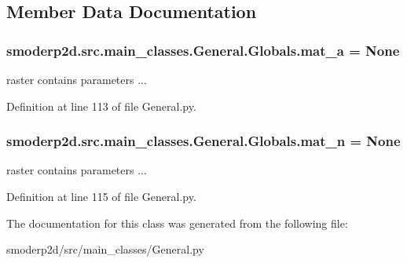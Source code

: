 \subsection{Member Data Documentation}
\hypertarget{classsmoderp2d_1_1src_1_1main__classes_1_1General_1_1Globals_a68216400ee957d32802e316cf9d21d75}{
\subsubsection[{mat\-\_\-a}]{\setlength{\rightskip}{0pt plus 5cm}smoderp2d.\-src.\-main\-\_\-classes.\-General.\-Globals.\-mat\-\_\-a = None\hspace{0.3cm}{\ttfamily [static]}}}\label{classsmoderp2d_1_1src_1_1main__classes_1_1General_1_1Globals_a68216400ee957d32802e316cf9d21d75}


raster contains parameters ... 



Definition at line 113 of file General.\-py.

\hypertarget{classsmoderp2d_1_1src_1_1main__classes_1_1General_1_1Globals_a5e657e5a7569cc4bcb1be595e5a16278}{
\subsubsection[{mat\-\_\-n}]{\setlength{\rightskip}{0pt plus 5cm}smoderp2d.\-src.\-main\-\_\-classes.\-General.\-Globals.\-mat\-\_\-n = None\hspace{0.3cm}{\ttfamily [static]}}}\label{classsmoderp2d_1_1src_1_1main__classes_1_1General_1_1Globals_a5e657e5a7569cc4bcb1be595e5a16278}


raster contains parameters ... 



Definition at line 115 of file General.\-py.



The documentation for this class was generated from the following file\-:\begin{DoxyCompactItemize}
\item 
smoderp2d/src/main\-\_\-classes/General.\-py\end{DoxyCompactItemize}

